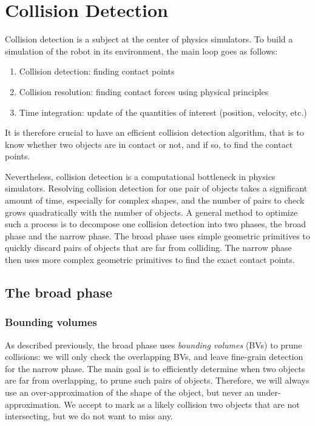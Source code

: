 \section{Collision Detection}
Collision detection is a subject at the center of physics simulators. To build a simulation of the robot in its environment, the main loop goes as follows:
\begin{enumerate}
    \item Collision detection: finding contact points
    \item Collision resolution: finding contact forces using physical principles
    \item Time integration: update of the quantities of interest (position, velocity, etc.)
\end{enumerate}
It is therefore crucial to have an efficient collision detection algorithm, that is to know whether two objects are in contact or not, and if so, to find the contact points.

Nevertheless, collision detection is a computational bottleneck in physics simulators. Resolving collision detection for one pair of objects takes a significant amount of time, especially for complex shapes, and the number of pairs to check grows quadratically with the number of objects. A general method to optimize such a process is to decompose one collision detection into two phases, the broad phase and the narrow phase. The broad phase uses simple geometric primitives to quickly discard pairs of objects that are far from colliding. The narrow phase then uses more complex geometric primitives to find the exact contact points.

\subsection{The broad phase}
\subsubsection{Bounding volumes}
As described previously, the broad phase uses \emph{bounding volumes} (BVs) to prune collisions: we will only check the overlapping BVs, and leave fine-grain detection for the narrow phase. The main goal is to efficiently determine when two objects are far from overlapping, to prune such pairs of objects. Therefore, we will always use an over-approximation of the shape of the object, but never an under-approximation. We accept to mark as a likely collision two objects that are not intersecting, but we do not want to miss any. 

